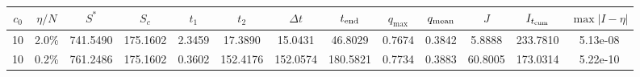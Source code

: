 \begin{tabular}{ccccccccccccc}
\toprule
$c_0$ & $\eta/N$ & $S^*$ & $S_c$ & $t_1$ & $t_2$ & $\Delta t$ & $t_{\rm end}$ & $q_{\max}$ & $q_{\rm mean}$ & $J$ & $I_{t_{\rm cum}}$ & $\max|I-\eta|$ \\
\midrule
10 & 2.0\% & 741.5490 & 175.1602 & 2.3459 & 17.3890 & 15.0431 & 46.8029 & 0.7674 & 0.3842 & 5.8888 & 233.7810 & 5.13e-08 \\
10 & 0.2\% & 761.2486 & 175.1602 & 0.3602 & 152.4176 & 152.0574 & 180.5821 & 0.7734 & 0.3883 & 60.8005 & 173.0314 & 5.22e-10 \\
\bottomrule
\end{tabular}
